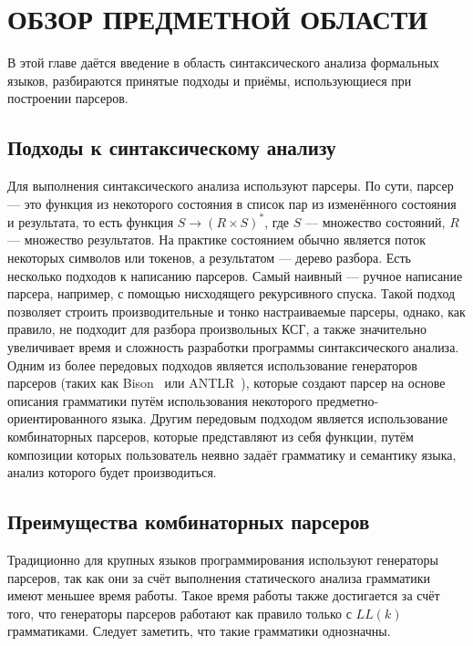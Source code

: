 \documentclass[times]{itmo-student-thesis}
\begin{document}
\chapter{ОБЗОР ПРЕДМЕТНОЙ ОБЛАСТИ}

В этой главе даётся введение в область синтаксического анализа формальных языков, разбираются принятые подходы и приёмы, 
использующиеся при построении парсеров.

\section{Подходы к синтаксическому анализу}\label{sec:parsing_approaches}

Для выполнения синтаксического анализа используют парсеры. По сути, парсер --- это функция из некоторого состояния в
список пар из изменённого состояния и результата, то есть функция $S \rightarrow (R \times S)^*$, где $S$
--- множество состояний, $R$ --- множество результатов. На практике состоянием обычно является поток
некоторых символов или токенов, а результатом --- дерево разбора. Есть несколько подходов к написанию парсеров. Самый
наивный --- ручное написание парсера, например, с помощью нисходящего рекурсивного спуска. Такой подход позволяет
строить производительные и тонко настраиваемые парсеры, однако, как правило, не подходит для разбора произвольных КСГ,
а также значительно увеличивает время и сложность разработки программы синтаксического анализа. Одним из более
передовых подходов является использование генераторов парсеров (таких как Bison~\cite{noauthor_bison_nodate} или
ANTLR~\cite{noauthor_antlr_nodate}), которые создают парсер на основе описания грамматики путём использования некоторого
предметно-ориентированного языка. Другим передовым подходом является использование комбинаторных парсеров, которые
представляют из себя функции, путём композиции которых пользователь неявно задаёт грамматику и семантику языка, анализ
которого будет производиться.

\section{Преимущества комбинаторных парсеров}\label{sec:parser_combinators_advantages}

Традиционно для крупных языков программирования используют генераторы парсеров, так как они за счёт выполнения
статического анализа грамматики имеют меньшее время работы. Такое время работы также достигается за счёт того, что
генераторы парсеров работают как правило только с $LL(k)$ грамматиками. Следует заметить, что такие
грамматики однозначны.
\end{document}
